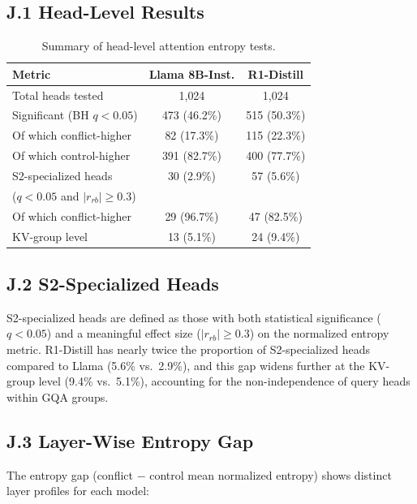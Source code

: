 \documentclass{article}
\begin{document}
\subsection*{J.1 Head-Level Results}

\begin{table}[ht]
\centering
\caption{Summary of head-level attention entropy tests.}
\label{tab:attention_heads}
\vspace{4pt}
\small
\begin{tabular}{lcc}
\toprule
\textbf{Metric} & \textbf{Llama 8B-Inst.} & \textbf{R1-Distill} \\
\midrule
Total heads tested                 & 1{,}024 & 1{,}024 \\
Significant (BH $q < 0.05$)       & 473 (46.2\%) & 515 (50.3\%) \\
\quad Of which conflict-higher     & 82 (17.3\%) & 115 (22.3\%) \\
\quad Of which control-higher      & 391 (82.7\%) & 400 (77.7\%) \\
\midrule
S2-specialized heads               & 30 (2.9\%)  & 57 (5.6\%) \\
\quad ($q < 0.05$ and $|r_{rb}| \geq 0.3$) & & \\
\quad Of which conflict-higher     & 29 (96.7\%) & 47 (82.5\%) \\
\quad KV-group level               & 13 (5.1\%)  & 24 (9.4\%) \\
\bottomrule
\end{tabular}
\end{table}

\subsection*{J.2 S2-Specialized Heads}

S2-specialized heads are defined as those with both statistical
significance ($q < 0.05$) and a meaningful effect size ($|r_{rb}|
\geq 0.3$) on the normalized entropy metric.  R1-Distill has
nearly twice the proportion of S2-specialized heads compared to
Llama (5.6\% vs.\ 2.9\%), and this gap widens further at the
KV-group level (9.4\% vs.\ 5.1\%), accounting for the
non-independence of query heads within GQA groups.

\subsection*{J.3 Layer-Wise Entropy Gap}

The entropy gap (conflict $-$ control mean normalized entropy) shows
distinct layer profiles for each model:
\end{document}
